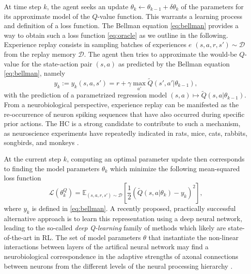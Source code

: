 \documentclass[10pt,letterpaper]{article}
\begin{document}
At time step $k$, the agent seeks an update $\theta_{k} \leftarrow \theta_{k-1} + \delta \theta_{k}$ of the parameters for its approximate model of the $Q$-value function. This warrants a learning process
and definition of a loss function.
The Bellman equation \eqref{eq:bellman} provides a way to obtain such a loss function \eqref{eq:oracle} as we outline in the following.
Experience replay consists in sampling
batches of experiences $e$
$(s, a, r, s') \sim \mathcal D$ from the replay memory $\mathcal D$.
The agent then tries to approximate
the would-be $Q$-value for the state-action pair $(s,a)$ as predicted by the Bellman equation \eqref{eq:bellman}, namely
\begin{equation}
  y_k := y_k(s,a,s') =  r + \gamma \max_{a'} \tilde{Q}(s', a'|\theta_{k-1}),
\end{equation}
with the prediction of a parametrized regression model $(s,a)
\mapsto \tilde{Q}(s, a|\theta_{k-1})$.
From a neurobiological perspective,
experience replay can be manifested as the re-occurrence of
neuron spiking sequences that have also occurred during specific prior actions.
The HC is a strong candidate to contribute to such a mechanism,
as neuroscience experiments have repeatedly indicated
in rats, mice, cats, rabbits, songbirds, and
monkeys \citep{buhry2011,nokia2010,dave2000,skaggs2007}.

At the current step $k$, computing an optimal parameter update then corresponds to
finding the model parameters $\theta_{k}$ which minimize the following mean-squared loss function
\begin{equation}
  \mathcal L(\theta^Q_{k})
  = \mathbb E_{(s, a, r, s') \sim \mathcal D}\left[\frac{1}{2}(\tilde{Q}(s, a|\theta_{k}) - y_k)^2\right],
  \label{eq:oracle}
\end{equation}
where $y_k$ is defined in \eqref{eq:bellman}.
A recently proposed, practically successful alternative approach
\citep{mnih2015,silver2016mastering} is to learn this
representation using a deep neural network, leading to the
so-called \textit{deep Q-learning} family of methods which
likely are state-of-the-art in RL.
The set of model parameters $\theta$ that instantiate the non-linear interactions
between layers of the artifical neural network
may find a neurobiological correspondence in the adaptive strengths of axonal
connections between neurons from the different levels
of the neural processing hierarchy
\citep{mesulam1998sensation, taylor2015global}.
\end{document}
